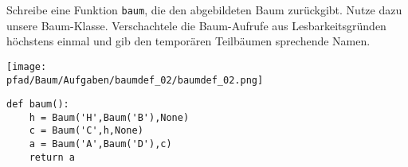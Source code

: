 \question[3]
Schreibe eine Funktion \texttt{baum}, die den abgebildeten Baum zurückgibt.
Nutze dazu unsere Baum-Klasse.
Verschachtele die Baum-Aufrufe aus Lesbarkeitsgründen
höchstens einmal und gib den temporären Teilbäumen sprechende Namen.

\texttt{[image: \\pfad/Baum/Aufgaben/baumdef\_02/baumdef\_02.png]}

\begin{solutionbox}{5cm}
\begin{lstlisting}
def baum():
    h = Baum('H',Baum('B'),None)
    c = Baum('C',h,None)
    a = Baum('A',Baum('D'),c)
    return a
\end{lstlisting}
\end{solutionbox}
